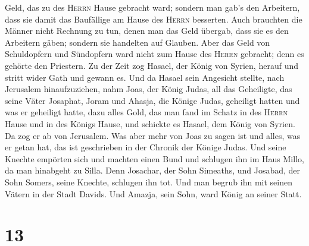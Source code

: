 Geld, das zu des \textsc{Herrn} Hause gebracht ward; 
sondern man gab's den Arbeitern, dass sie damit das Baufällige am Hause
des \textsc{Herrn} besserten.  Auch brauchten die Männer
nicht Rechnung zu tun, denen man das Geld übergab, dass sie es den
Arbeitern gäben; sondern sie handelten auf Glauben.  Aber
das Geld von Schuldopfern und Sündopfern ward nicht zum Hause des
\textsc{Herrn} gebracht; denn es gehörte den Priestern. 
Zu der Zeit zog Hasael, der König von Syrien, herauf und stritt wider
Gath und gewann es. Und da Hasael sein Angesicht stellte, nach Jerusalem
hinaufzuziehen,  nahm Joas, der König Judas, all das
Geheiligte, das seine Väter Josaphat, Joram und Ahasja, die Könige
Judas, geheiligt hatten und was er geheiligt hatte, dazu alles Gold, das
man fand im Schatz in des \textsc{Herrn} Hause und in des Königs Hause,
und schickte es Hasael, dem König von Syrien. Da zog er ab von
Jerusalem.  Was aber mehr von Joas zu sagen ist und
alles, was er getan hat, das ist geschrieben in der Chronik der Könige
Judas.  Und seine Knechte empörten sich und machten einen
Bund und schlugen ihn im Haus Millo, da man hinabgeht zu Silla.
 Denn Josachar, der Sohn Simeaths, und Josabad, der Sohn
Somers, seine Knechte, schlugen ihn tot. Und man begrub ihn mit seinen
Vätern in der Stadt Davids. Und Amazja, sein Sohn, ward König an seiner
Statt.

\hypertarget{section-12}{%
\section{13}\label{section-12}}


